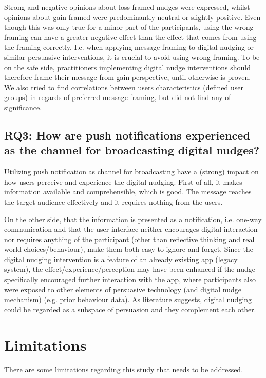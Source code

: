 Strong and negative opinions about loss-framed nudges were expressed, whilst opinions about gain framed were predominantly neutral or slightly positive. Even though this was only true for a minor part of the participants, using the wrong framing can have a greater negative effect than the effect that comes from using the framing correctly. I.e. when applying message framing to digital nudging or similar persuasive interventions, it is crucial to avoid using wrong framing. To be on the safe side, practitioners implementing digital nudge interventions should therefore frame their message from gain perspective, until otherwise is proven. We also tried to find correlations between users characteristics (defined user groups) in regards of preferred message framing, but did not find any of significance. 

\subsection{RQ3: How are push notifications experienced as the channel for broadcasting digital nudges?}
Utilizing push notification as channel for broadcasting have a (strong) impact on how users perceive and experience the digital nudging. First of all, it makes information available and comprehensible, which is good. The message reaches the target audience effectively and it requires nothing from the users.

On the other side, that the information is presented as a notification, i.e. one-way communication and that the user interface neither encourages digital interaction nor requires anything of the participant (other than reflective thinking and real world choices/behaviour), make them both easy to ignore and forget. Since the digital nudging intervention is a feature of an already existing app (legacy system), the effect/experience/perception may have been enhanced if the nudge specifically encouraged further interaction with the app, where participants also were exposed to other elements of persuasive technology (and digital nudge mechanism) (e.g. prior behaviour data). As literature suggests, digital nudging could be regarded as a subspace of persuasion and they complement each other.  

\section{Limitations}
There are some limitations regarding this study that needs to be addressed.

